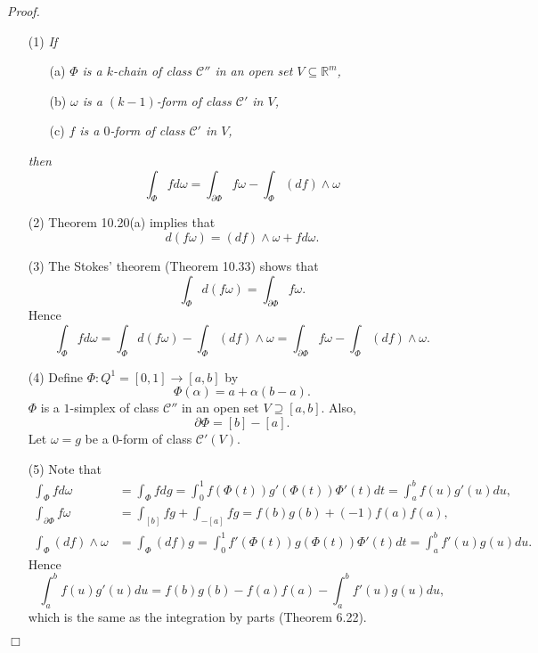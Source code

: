 \documentclass{article}
\begin{document}
\emph{Proof.}
\begin{enumerate}
\item[(1)]
  \emph{If}
  \begin{enumerate}
  \item[(a)]
    \emph{$\Phi$ is a $k$-chain of class $\mathscr{C}''$ in an open set $V \subseteq \mathbb{R}^m$,}

  \item[(b)]
    \emph{$\omega$ is a $(k-1)$-form of class $\mathscr{C}'$ in $V$,}

  \item[(c)]
    \emph{$f$ is a $0$-form of class $\mathscr{C}'$ in $V$,}
  \end{enumerate}
  \emph{then}
  \[
    \int_{\Phi} fd\omega
    = \int_{\partial\Phi} f\omega - \int_{\Phi}(df) \wedge \omega
  \]

\item[(2)]
  Theorem 10.20(a) implies that
  \[
    d(f\omega) = (df) \wedge \omega + f d\omega.
  \]

\item[(3)]
  The Stokes' theorem (Theorem 10.33) shows that
  \[
    \int_{\Phi} d(f\omega) = \int_{\partial\Phi} f\omega.
  \]
  Hence
  \[
    \int_{\Phi} fd\omega
    = \int_{\Phi} d(f\omega) - \int_{\Phi}(df) \wedge \omega
    = \int_{\partial\Phi} f\omega - \int_{\Phi}(df) \wedge \omega.
  \]

\item[(4)]
  Define $\Phi: Q^1 = [0,1] \to [a,b]$ by
  \[
    \Phi(\alpha) = a + \alpha (b - a).
  \]
  $\Phi$ is a $1$-simplex of class $\mathscr{C}''$ in an open set $V \supseteq [a,b]$.
  Also,
  \[
    \partial\Phi = [b] - [a].
  \]
  Let $\omega = g$ be a $0$-form of class $\mathscr{C}'(V)$.

\item[(5)]
  Note that
  \begin{align*}
    \int_{\Phi} fd\omega
    &= \int_{\Phi} fdg
    = \int_{0}^{1} f(\Phi(t)) g'(\Phi(t)) \Phi'(t) dt
    = \int_{a}^{b} f(u) g'(u) du, \\
    \int_{\partial\Phi} f\omega
    &= \int_{[b]} fg + \int_{-[a]} fg
    = f(b)g(b) + (-1) f(a)f(a), \\
    \int_{\Phi}(df) \wedge \omega
    &= \int_{\Phi}(df) g
    = \int_{0}^{1} f'(\Phi(t)) g(\Phi(t)) \Phi'(t) dt
    = \int_{a}^{b} f'(u) g(u) du.
  \end{align*}
  Hence
  \[
    \int_{a}^{b} f(u) g'(u) du = f(b)g(b) - f(a)f(a) - \int_{a}^{b} f'(u) g(u) du,
  \]
  which is the same as the integration by parts (Theorem 6.22).
\end{enumerate}
$\Box$ \\\\
\end{document}
